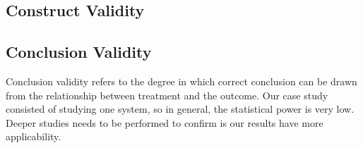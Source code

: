 \subsection{Construct Validity} %
\label{sub:construct_validity}

\subsection{Conclusion Validity} %
\label{sub:conclusion_validity}
Conclusion validity refers to the degree in which correct conclusion can be drawn from the relationship between treatment and the outcome. Our case study consisted of studying one system, so in general, the statistical power is very low. Deeper studies needs to be performed to confirm is our results have more applicability.












